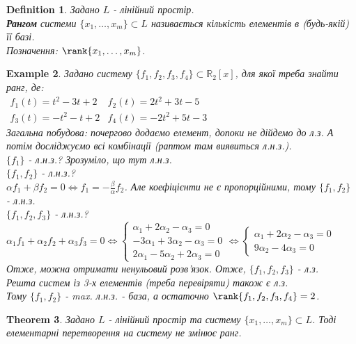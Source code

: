 \documentclass[a4paper, 10pt]{article}
\theoremstyle{theoremdd}
\newtheorem{theorem}{Theorem}[subsection]
\newtheorem{definition}[theorem]{Definition}
\newtheorem{example}[theorem]{Example}
\begin{document}
	\begin{definition}
	Задано $L$ - лінійний простір.\\
	\textbf{Рангом} системи $\{x_1, \dots, x_m\} \subset L$ називається кількість елементів в (будь-якій) її базі.\\
	Позначення: $\rank\{x_1, \dots, x_m\}$.
	\end{definition}
	
	\begin{example}
	Задано систему $\{f_1, f_2, f_3, f_4\} \subset \mathbb{R}_2[x]$, для якої треба знайти ранг, де:\\
	$\begin{matrix}
	f_1(t) = t^2-3t+2 & f_2(t) = 2t^2+3t-5 \\
	f_3(t) = -t^2-t+2 & f_4(t) = -2t^2+5t-3
	\end{matrix}
	$\\
	Загальна побудова: почергово додаємо елемент, допоки не дійдемо до л.з. А потім досліджуємо всі комбінації (раптом там виявиться л.н.з.).\\
	$\{f_1\}$ - л.н.з.? Зрозуміло, що тут л.н.з.\\
	$\{f_1, f_2 \}$ - л.н.з.? \\ $\alpha f_1 + \beta f_2 = 0 \iff \displaystyle f_1 = -\frac{\beta}{\alpha}f_2$. Але коефіцієнти не є пропорційними, тому $\{f_1, f_2\}$ - л.н.з.\\
	$\{f_1, f_2, f_3\}$ - л.н.з.? \\
	$\alpha_1 f_1 + \alpha_2 f_2 + \alpha_3 f_3 = 0 \iff 
	\begin{cases}
	\alpha_1 + 2\alpha_2 - \alpha_3 = 0 \\
	-3\alpha_1 + 3\alpha_2 - \alpha_3 = 0 \\
	2\alpha_1 - 5\alpha_2 + 2\alpha_3 = 0
	\end{cases} \iff
	\begin{cases}
	\alpha_1 + 2\alpha_2 - \alpha_3 = 0 \\
	9\alpha_2 - 4\alpha_3 = 0
	\end{cases}
	$\\
	Отже, можна отримати ненульовий розв'язок. Отже, $\{f_1, f_2, f_3\}$ - л.з.\\
	Решта систем із 3-х елементів (треба перевіряти) також є л.з.\\
	Тому $\{f_1, f_2\}$ - max. л.н.з. - база, а остаточно $\rank\{f_1, f_2, f_3, f_4 \} = 2$.
	\end{example}
	
	\begin{theorem}
	Задано $L$ - лінійний простір та систему $\{x_1,\dots,x_m\} \subset L$. Тоді елементарні перетворення на систему не змінює ранг.
	\end{theorem}
	
\end{document}

